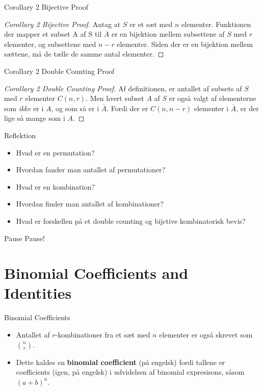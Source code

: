 \documentclass{beamer}
\begin{document}
\begin{frame}{Corollary 2 Bijective Proof}
   \begin{proof}[Corollary 2 Bijective Proof]
      Antag at $S$ er et sæt med $n$ elementer. Funktionen der mapper et subset A af S til $\overline{A}$ er en bijektion mellem subsettene af $S$ med $r$ elementer, og subsettene med $n-r$ elementer. Siden der er en bijektion mellem sættene, må de tælle de samme antal elementer. 
   \end{proof} 
\end{frame}

\begin{frame}{Corollary 2 Double Counting Proof}
    \begin{proof}[Corollary 2 Double Counting Proof]
        Af definitionen, er antallet af subsets af $S$ med $r$ elementer $C(n,r)$. Men hvert subset $A$ af $S$ er også valgt af elementerne som \textit{ikke} er i $A$, og som så er i $\overline{A}$. Fordi der er $C(n,n-r)$ elementer i $\overline{A}$, er der lige så mange som i $A$.
    \end{proof}
\end{frame}

\begin{frame}{Reflektion}
   \begin{itemize}
       \item Hvad er en permutation? 
       \item Hvordan fander man antallet af permutationer? 
        \item Hvad er en kombination? 
        \item Hvordan finder man antallet af kombinationer? 
        \item Hvad er forskellen på et double counting og bijctive kombinatorisk bevis? 
   \end{itemize} 
\end{frame}

\begin{frame}{Pause}
    Pause!
\end{frame}

\section{Binomial Coefficients and Identities}

\begin{frame}{Binomial Coefficients}
\begin{itemize}
    \item Antallet af $r$-kombinationer fra et sæt med $n$ elementer er også skrevet som $\binom{n}{r}$.
    \item Dette kaldes en \textbf{binomial coefficient} (på engelsk) fordi tallene er coefficients (igen, på engelsk) i udvidelsen af binomial expresisons, såsom $(a+b)^n$.
\end{itemize}
\end{frame}
\end{document}
